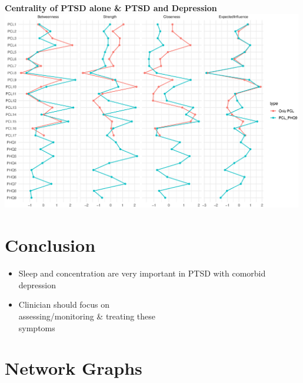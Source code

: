 \documentclass[]{betterposter}
\begin{document}
{\begin{center}
\textbf{Centrality of PTSD alone \& PTSD and Depression}
    \includegraphics[width=0.99\textwidth, height=0.7\textwidth]{img/centralityTotal.eps}
\end{center}

\section{Conclusion}
\begin{itemize}
    \item Sleep and concentration are very important in PTSD with comorbid depression
    \item Clinician should focus on\\ assessing/monitoring \& treating these\\ symptoms
\end{itemize}

\vfill



}{


\section{Network Graphs}

}
\end{document}
